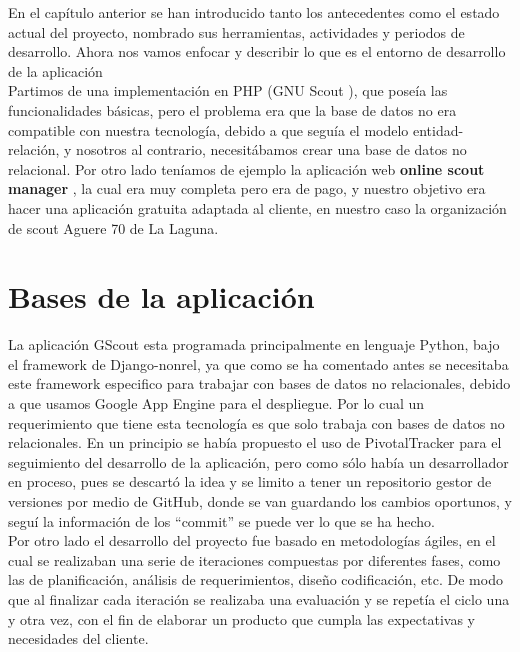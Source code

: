 

En el capítulo anterior se han introducido tanto los antecedentes como el estado actual del proyecto, 
nombrado sus herramientas, actividades y periodos de desarrollo. Ahora nos vamos enfocar y describir lo que es el
entorno de desarrollo de la aplicación\\

Partimos de una implementación en PHP (GNU Scout \cite{URL:GNUscout}), que poseía las funcionalidades básicas, pero el problema era que la base de datos
no era compatible con nuestra tecnología, debido a que seguía el modelo entidad-relación, y nosotros al contrario, necesitábamos
crear una base de datos no relacional. Por otro lado teníamos de ejemplo la aplicación web \textbf{online scout manager} \cite{URL:OnlineScoutManager}, la cual era muy completa
pero era de pago, y nuestro objetivo era hacer una aplicación gratuita adaptada al cliente, en nuestro caso la organización de scout Aguere 70 de La Laguna.



\section{Bases de la aplicación}
\label{2:sec1}

La aplicación GScout esta programada principalmente en lenguaje Python, bajo el framework de Django-nonrel,  
ya que como se ha comentado antes se necesitaba este framework especifico para trabajar con bases de datos no relacionales,
debido a que usamos Google App Engine para el despliegue. Por lo cual un requerimiento que tiene esta tecnología es que solo trabaja con
bases de datos no relacionales. En un principio se había propuesto el uso de PivotalTracker para el seguimiento del desarrollo de la aplicación, 
pero como sólo había un desarrollador en proceso, pues se descartó la idea y se limito a tener un repositorio gestor de versiones por medio de
GitHub, donde se van guardando los cambios oportunos, y seguí la información de los ``commit'' se puede ver lo que se ha hecho.\\

Por otro lado el desarrollo del proyecto fue basado en metodologías ágiles, en el cual se realizaban una serie de iteraciones compuestas por diferentes fases, como 
las de planificación, análisis de requerimientos, diseño codificación, etc. De modo que al finalizar cada iteración se realizaba una evaluación y se repetía el ciclo una y otra vez,
con el fin de elaborar un producto que cumpla las expectativas y necesidades del cliente.\\

